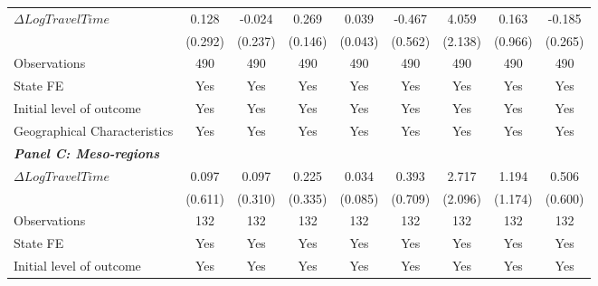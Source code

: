 \begin{table}[p]
{{\begin{tabular}{l*{8}{c}}
$\Delta Log Travel Time$&       0.128         &      -0.024         &       0.269\sym{*}  &       0.039         &      -0.467         &       4.059\sym{*}  &       0.163         &      -0.185         \\
&     (0.292)         &     (0.237)         &     (0.146)         &     (0.043)         &     (0.562)         &     (2.138)         &     (0.966)         &     (0.265)         \\
Observations        &         490         &         490         &         490         &         490         &         490         &         490         &         490         &         490         \\
State FE            &         Yes         &         Yes         &         Yes         &         Yes         &         Yes         &         Yes         &         Yes         &         Yes         \\
Initial level of outcome&         Yes         &         Yes         &         Yes         &         Yes         &         Yes         &         Yes         &         Yes         &         Yes         \\
Geographical Characteristics&         Yes         &         Yes         &         Yes         &         Yes         &         Yes         &         Yes         &         Yes         &         Yes         \\
\hline
\multicolumn{8}{l}{\linebreak \textbf{\textit{Panel C: Meso-regions}}} \\
$\Delta Log Travel Time$&       0.097         &       0.097         &       0.225         &       0.034         &       0.393         &       2.717         &       1.194         &       0.506         \\
&     (0.611)         &     (0.310)         &     (0.335)         &     (0.085)         &     (0.709)         &     (2.096)         &     (1.174)         &     (0.600)         \\
Observations        &         132         &         132         &         132         &         132         &         132         &         132         &         132         &         132         \\
State FE            &         Yes         &         Yes         &         Yes         &         Yes         &         Yes         &         Yes         &         Yes         &         Yes         \\
Initial level of outcome&         Yes         &         Yes         &         Yes         &         Yes         &         Yes         &         Yes         &         Yes         &         Yes         \\

\end{tabular}}}
\end{table}
